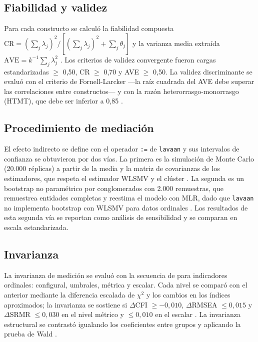\documentclass[11pt,a4paper]{article}
\newcommand{\chisq}{$\chi^2$}
\begin{document}
\subsection{Fiabilidad y validez}

Para cada constructo se calculó la fiabilidad compuesta
$\mathrm{CR} = (\sum_j \lambda_j)^2 / [(\sum_j \lambda_j)^2 + \sum_j \theta_j]$ y la varianza
media extraída $\mathrm{AVE} = k^{-1}\sum_j \lambda_j^2$ \citep{fornell1981}. Los criterios de
validez convergente fueron cargas estandarizadas $\geq$ 0,50, CR $\geq$ 0,70 y AVE $\geq$
0,50. La validez discriminante se evaluó con el criterio de Fornell-Larcker —la raíz cuadrada
del AVE debe superar las correlaciones entre constructos— y con la razón
heterorrasgo-monorrasgo (HTMT), que debe ser inferior a 0,85 \citep{henseler2015}.

\subsection{Procedimiento de mediación}

El efecto indirecto se define con el operador \texttt{:=} de \texttt{lavaan} y sus intervalos
de confianza se obtuvieron por dos vías. La primera es la simulación de Monte Carlo
(20.000 réplicas) a partir de la media y la matriz de covarianzas de los estimadores, que
respeta el estimador WLSMV y el clúster \citep{mackinnon2004,preacher2012}. La segunda es un
bootstrap no paramétrico por conglomerados con 2.000 remuestras, que remuestrea entidades
completas y reestima el modelo con MLR, dado que \texttt{lavaan} no implementa bootstrap con
WLSMV para datos ordinales \citep{preacher2008,hayes2022}. Los resultados de esta segunda
vía se reportan como análisis de sensibilidad y se comparan en escala estandarizada.

\subsection{Invarianza}

La invarianza de medición se evaluó con la secuencia de \citet{wu2016} para indicadores
ordinales: configural, umbrales, métrica y escalar. Cada nivel se comparó con el anterior
mediante la diferencia escalada de \chisq{} y los cambios en los índices aproximados; la
invarianza se sostiene si $\Delta$CFI $\geq -0,010$, $\Delta$RMSEA $\leq 0,015$ y
$\Delta$SRMR $\leq 0,030$ en el nivel métrico y $\leq 0,010$ en el escalar
\citep{cheung2002,chen2007,meredith1993,vandenberg2000,putnick2016}. La invarianza
estructural se contrastó igualando los coeficientes entre grupos y aplicando la prueba de
Wald \citep{satorra2001,byrne1989}.
\end{document}
